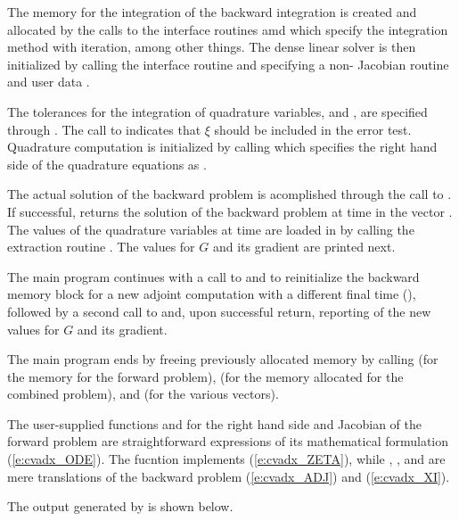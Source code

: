 The {\cvodes} memory for the integration of the backward integration is created and allocated
by the calls to the interface routines  amd  which 
specify the  integration method with  iteration, among other things.
The dense linear solver {\cvdense} is then initialized by calling the 
interface routine and specifying a non- Jacobian routine  and user data
.

The tolerances for the integration of quadrature variables,  and
, are specified through .
The call to  indicates that $\xi$ should be included
in the error test.
Quadrature computation is initialized by calling 
which specifies the right hand side of the quadrature equations as .

The actual solution of the backward problem is acomplished through the call to
. If successful,  returns the solution of the backward 
problem at time  in the vector . The values of the quadrature
variables at time  are loaded in  by calling the extraction
routine . The values for $G$ and its gradient are printed next.

The main program continues with a call to  and
 to reinitialize the 
backward memory block for a new adjoint computation with a different final 
time (), followed by a second call to  and, upon successful
return, reporting of the new values for $G$ and its gradient.

The main program ends by freeing previously allocated memory by calling 
 (for the {\cvodes} memory for the forward problem),  
(for the memory allocated for the combined problem), and  
(for the various vectors).

The user-supplied functions  and  for the right hand side and
Jacobian of the forward problem are straightforward expressions of its 
mathematical formulation (\ref{e:cvadx_ODE}). The fucntion  implements
(\ref{e:cvadx_ZETA}), while , , and  are mere translations 
of the backward problem (\ref{e:cvadx_ADJ}) and (\ref{e:cvadx_XI}).

The output generated by  is shown below.

\vspace{0.1in}


